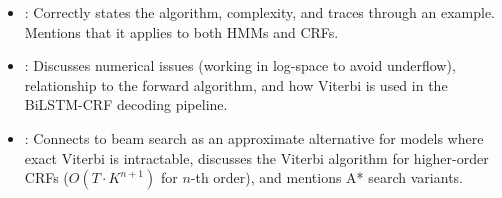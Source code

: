 \begin{interviewq}
\goodgreat
\begin{itemize}
    \item {}: Correctly states the algorithm, complexity, and traces
          through an example.  Mentions that it applies to both HMMs and CRFs.
    \item {}: Discusses numerical issues (working in log-space to
          avoid underflow), relationship to the forward algorithm, and how
          Viterbi is used in the BiLSTM-CRF decoding pipeline.
    \item {}: Connects to beam search as an approximate
          alternative for models where exact Viterbi is intractable, discusses
          the Viterbi algorithm for higher-order CRFs ($O(T \cdot K^{n+1})$
          for $n$-th order), and mentions A* search variants.
\end{itemize}

\end{interviewq}

\vspace{0.5em}

